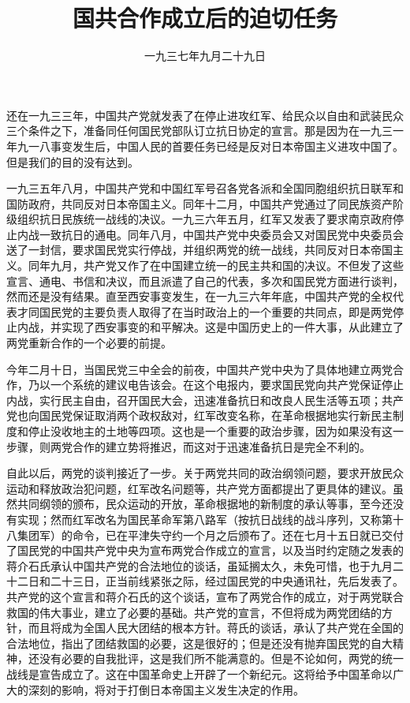 
\title{国共合作成立后的迫切任务}
\date{一九三七年九月二十九日}
\maketitle


还在一九三三年，中国共产党就发表了在停止进攻红军、给民众以自由和武装民众三个条件之下，准备同任何国民党部队订立抗日协定的宣言。那是因为在一九三一年九一八事变发生后，中国人民的首要任务已经是反对日本帝国主义进攻中国了。但是我们的目的没有达到。

一九三五年八月，中国共产党和中国红军号召各党各派和全国同胞组织抗日联军和国防政府，共同反对日本帝国主义。同年十二月，中国共产党通过了同民族资产阶级组织抗日民族统一战线的决议。一九三六年五月，红军又发表了要求南京政府停止内战一致抗日的通电。同年八月，中国共产党中央委员会又对国民党中央委员会送了一封信，要求国民党实行停战，并组织两党的统一战线，共同反对日本帝国主义。同年九月，共产党又作了在中国建立统一的民主共和国的决议。不但发了这些宣言、通电、书信和决议，而且派遣了自己的代表，多次和国民党方面进行谈判，然而还是没有结果。直至西安事变发生，在一九三六年年底，中国共产党的全权代表才同国民党的主要负责人取得了在当时政治上的一个重要的共同点，即是两党停止内战，并实现了西安事变的和平解决。这是中国历史上的一件大事，从此建立了两党重新合作的一个必要的前提。

今年二月十日，当国民党三中全会的前夜，中国共产党中央为了具体地建立两党合作，乃以一个系统的建议电告该会。在这个电报内，要求国民党向共产党保证停止内战，实行民主自由，召开国民大会，迅速准备抗日和改良人民生活等五项；共产党也向国民党保证取消两个政权敌对，红军改变名称，在革命根据地实行新民主制度和停止没收地主的土地等四项。这也是一个重要的政治步骤，因为如果没有这一步骤，则两党合作的建立势将推迟，而这对于迅速准备抗日是完全不利的。

自此以后，两党的谈判接近了一步。关于两党共同的政治纲领问题，要求开放民众运动和释放政治犯问题，红军改名问题等，共产党方面都提出了更具体的建议。虽然共同纲领的颁布，民众运动的开放，革命根据地的新制度的承认等事，至今还没有实现；然而红军改名为国民革命军第八路军（按抗日战线的战斗序列，又称第十八集团军）的命令，已在平津失守约一个月之后颁布了。还在七月十五日就已交付了国民党的中国共产党中央为宣布两党合作成立的宣言，以及当时约定随之发表的蒋介石氏承认中国共产党的合法地位的谈话，虽延搁太久，未免可惜，也于九月二十二日和二十三日，正当前线紧张之际，经过国民党的中央通讯社，先后发表了。共产党的这个宣言和蒋介石氏的这个谈话，宣布了两党合作的成立，对于两党联合救国的伟大事业，建立了必要的基础。共产党的宣言，不但将成为两党团结的方针，而且将成为全国人民大团结的根本方针。蒋氏的谈话，承认了共产党在全国的合法地位，指出了团结救国的必要，这是很好的；但是还没有抛弃国民党的自大精神，还没有必要的自我批评，这是我们所不能满意的。但是不论如何，两党的统一战线是宣告成立了。这在中国革命史上开辟了一个新纪元。这将给予中国革命以广大的深刻的影响，将对于打倒日本帝国主义发生决定的作用。

